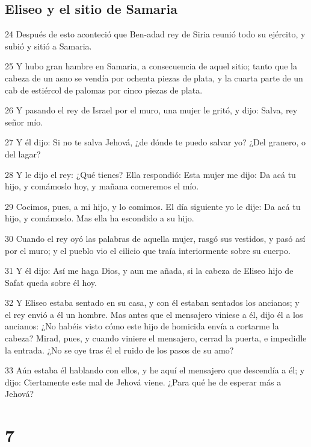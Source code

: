 \section*{Eliseo y el sitio de Samaria}

\par 24 Después de esto aconteció que Ben-adad rey de Siria reunió todo su ejército, y subió y sitió a Samaria.
\par 25 Y hubo gran hambre en Samaria, a consecuencia de aquel sitio; tanto que la cabeza de un asno se vendía por ochenta piezas de plata, y la cuarta parte de un cab de estiércol de palomas por cinco piezas de plata.
\par 26 Y pasando el rey de Israel por el muro, una mujer le gritó, y dijo: Salva, rey señor mío.
\par 27 Y él dijo: Si no te salva Jehová, ¿de dónde te puedo salvar yo? ¿Del granero, o del lagar?
\par 28 Y le dijo el rey: ¿Qué tienes? Ella respondió: Esta mujer me dijo: Da acá tu hijo, y comámoslo hoy, y mañana comeremos el mío.
\par 29 Cocimos, pues, a mi hijo, y lo comimos. El día siguiente yo le dije: Da acá tu hijo, y comámoslo. Mas ella ha escondido a su hijo.
\par 30 Cuando el rey oyó las palabras de aquella mujer, rasgó sus vestidos, y pasó así por el muro; y el pueblo vio el cilicio que traía interiormente sobre su cuerpo.
\par 31 Y él dijo: Así me haga Dios, y aun me añada, si la cabeza de Eliseo hijo de Safat queda sobre él hoy.
\par 32 Y Eliseo estaba sentado en su casa, y con él estaban sentados los ancianos; y el rey envió a él un hombre. Mas antes que el mensajero viniese a él, dijo él a los ancianos: ¿No habéis visto cómo este hijo de homicida envía a cortarme la cabeza? Mirad, pues, y cuando viniere el mensajero, cerrad la puerta, e impedidle la entrada. ¿No se oye tras él el ruido de los pasos de su amo?
\par 33 Aún estaba él hablando con ellos, y he aquí el mensajero que descendía a él; y dijo: Ciertamente este mal de Jehová viene. ¿Para qué he de esperar más a Jehová?

\chapter{7}

